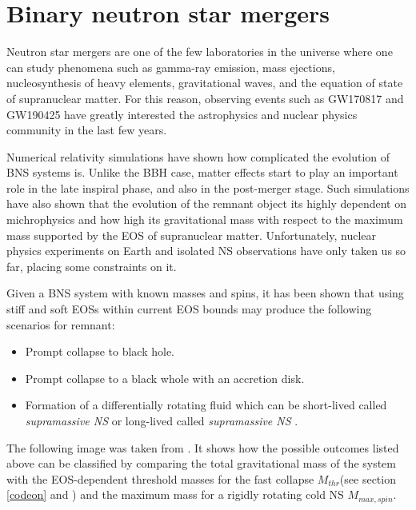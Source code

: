 \chapter{Binary neutron star mergers}\label{BNS-merg}

Neutron star mergers are one of the few laboratories in the universe where one can study phenomena such as gamma-ray emission, mass ejections, nucleosynthesis of heavy elements, gravitational waves, and the equation of state of supranuclear matter. For this reason,  observing events such as GW170817 and GW190425 have greatly interested the astrophysics and nuclear physics community in the last few years.
 
Numerical relativity simulations have shown how complicated the evolution of BNS systems is. Unlike the BBH case, matter effects start to play an important role in the late inspiral phase, and also in the post-merger stage. Such simulations have also shown that the evolution of the remnant object its highly dependent on  michrophysics and how high its gravitational mass with respect to the maximum mass supported by the EOS of supranuclear matter. Unfortunately, nuclear physics experiments on Earth and isolated NS observations have only taken us so far, placing some constraints on it.

Given a BNS system with known masses and spins, it has been shown that using stiff and soft EOSs within current EOS bounds may produce the following scenarios for remnant:

\begin{itemize}
\item Prompt collapse to black hole.
\item Prompt collapse to a black whole with an accretion disk.
\item Formation of a differentially rotating fluid which can be short-lived called \textit{supramassive NS} or long-lived called \textit{supramassive NS} \cite{Shibata:2019wef, Kastaun_2021}.
\end{itemize}


The following image was taken from \cite{Shibata:2019wef}. It shows how the possible outcomes listed above  can be classified by comparing the total gravitational mass of the system with the EOS-dependent threshold masses for the fast collapse $M_{thr}$(see section \ref{codeon} and \cite{Kashyap_2022}) and the maximum mass for a rigidly rotating cold NS $M_{max,spin}$.



